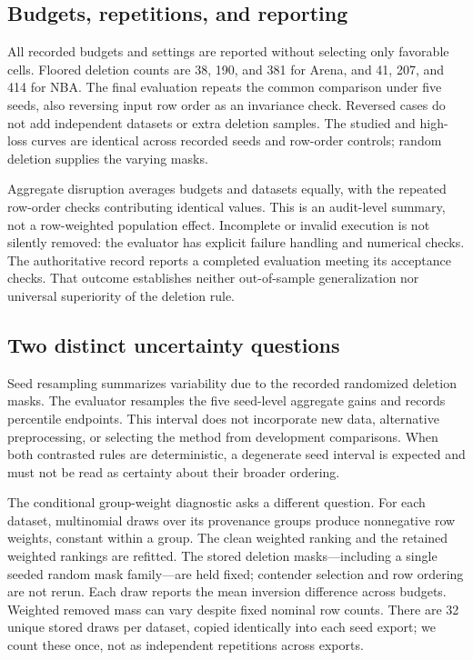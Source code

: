 \documentclass{article}
\begin{document}
\subsection{Budgets, repetitions, and reporting}
All recorded budgets and settings are reported without selecting only favorable cells. Floored deletion counts are 38, 190, and 381 for Arena, and 41, 207, and 414 for NBA. The final evaluation repeats the common comparison under five seeds, also reversing input row order as an invariance check. Reversed cases do not add independent datasets or extra deletion samples. The studied and high-loss curves are identical across recorded seeds and row-order controls; random deletion supplies the varying masks.

Aggregate disruption averages budgets and datasets equally, with the repeated row-order checks contributing identical values. This is an audit-level summary, not a row-weighted population effect. Incomplete or invalid execution is not silently removed: the evaluator has explicit failure handling and numerical checks. The authoritative record reports a completed evaluation meeting its acceptance checks. That outcome establishes neither out-of-sample generalization nor universal superiority of the deletion rule.

\subsection{Two distinct uncertainty questions}
Seed resampling summarizes variability due to the recorded randomized deletion masks. The evaluator resamples the five seed-level aggregate gains and records percentile endpoints. This interval does not incorporate new data, alternative preprocessing, or selecting the method from development comparisons. When both contrasted rules are deterministic, a degenerate seed interval is expected and must not be read as certainty about their broader ordering.

The conditional group-weight diagnostic asks a different question. For each dataset, multinomial draws over its provenance groups produce nonnegative row weights, constant within a group. The clean weighted ranking and the retained weighted rankings are refitted. The stored deletion masks---including a single seeded random mask family---are held fixed; contender selection and row ordering are not rerun. Each draw reports the mean inversion difference across budgets. Weighted removed mass can vary despite fixed nominal row counts. There are 32 unique stored draws per dataset, copied identically into each seed export; we count these once, not as independent repetitions across exports.
\end{document}
